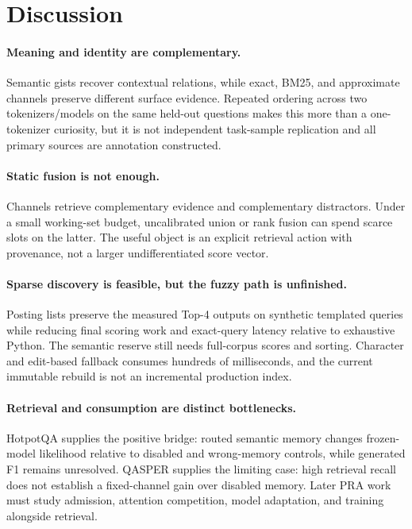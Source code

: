 \documentclass[11pt]{article}
\begin{document}
\section{Discussion}
\paragraph{Meaning and identity are complementary.}
Semantic gists recover contextual relations, while exact, BM25, and approximate channels preserve different surface evidence. Repeated ordering across two tokenizers/models on the same held-out questions makes this more than a one-tokenizer curiosity, but it is not independent task-sample replication and all primary sources are annotation constructed.

\paragraph{Static fusion is not enough.}
Channels retrieve complementary evidence and complementary distractors. Under a small working-set budget, uncalibrated union or rank fusion can spend scarce slots on the latter. The useful object is an explicit retrieval action with provenance, not a larger undifferentiated score vector.

\paragraph{Sparse discovery is feasible, but the fuzzy path is unfinished.}
Posting lists preserve the measured Top-4 outputs on synthetic templated queries while reducing final scoring work and exact-query latency relative to exhaustive Python. The semantic reserve still needs full-corpus scores and sorting. Character and edit-based fallback consumes hundreds of milliseconds, and the current immutable rebuild is not an incremental production index.

\paragraph{Retrieval and consumption are distinct bottlenecks.}
HotpotQA supplies the positive bridge: routed semantic memory changes frozen-model likelihood relative to disabled and wrong-memory controls, while generated F1 remains unresolved. QASPER supplies the limiting case: high retrieval recall does not establish a fixed-channel gain over disabled memory. Later PRA work must study admission, attention competition, model adaptation, and training alongside retrieval.
\end{document}
